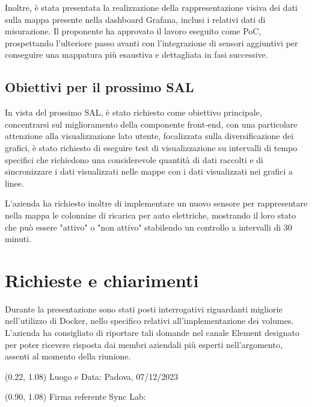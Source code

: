 \documentclass{article}
\begin{document}
    Inoltre, è stata presentata la realizzazione della rappresentazione visiva dei dati sulla mappa presente nella dashboard Grafana, inclusi i relativi dati di misurazione. Il proponente ha approvato il lavoro eseguito come PoC, prospettando l'ulteriore passo avanti con l'integrazione di sensori aggiuntivi per conseguire una mappatura più esaustiva e dettagliata in fasi successive.

    \subsection{Obiettivi per il prossimo SAL}
    In vista del prossimo SAL, è stato richiesto come obiettivo principale, concentrarsi sul miglioramento della componente front-end, con una particolare attenzione alla visualizzazione lato utente, focalizzata sulla diversificazione dei grafici, è stato richiesto di eseguire test di visualizzazione su intervalli di tempo specifici che richiedono una considerevole quantità di dati raccolti e di sincronizzare i dati visualizzati nelle mappe con i dati visualizzati nei grafici a linee.
    
    L'azienda ha richiesto inoltre di implementare un nuovo sensore per rappresentare nella mappa le colonnine di ricarica per auto elettriche, mostrando il loro stato che può essere "attivo" o "non attivo" stabilendo un controllo a intervalli di 30 minuti.

\section{Richieste e chiarimenti}
Durante la presentazione sono stati posti interrogativi riguardanti migliorie nell'utilizzo di Docker, nello specifico relativi all'implementazione dei volumes. L'azienda ha consigliato di riportare tali domande nel canale Element designato per poter ricevere risposta dai membri aziendali più esperti nell'argomento, assenti al momento della riunione.

\begin{textblock*}{\textwidth}(0.22\textwidth, 1.08\textheight)
    Luogo e Data: Padova, 07/12/2023
\end{textblock*}

\begin{textblock*}{\textwidth}(0.90\textwidth, 1.08\textheight)
        Firma referente Sync Lab:
\end{textblock*}
\end{document}
